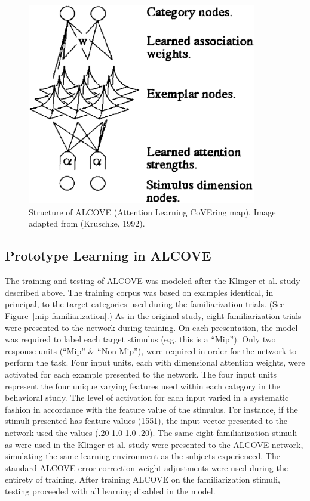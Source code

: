 \begin{figure}[ht]
\begin{center}
	\includegraphics[width=100mm]{figures/alcove.eps}
\end{center}
\caption{Structure of ALCOVE (Attention Learning CoVEring map).  Image adapted from (Kruschke, 1992).}
\label{alcove}
\end{figure} 

\subsection{Prototype Learning in ALCOVE}
The training and testing of ALCOVE was modeled after the Klinger et al. study described above.  The training corpus was based on examples identical, in principal, to the target categories used during the familiarization trials. (See Figure~\ref{mip-familiarization}.)  As in the original study, eight familiarization trials were presented to the network during training.  On each presentation, the model was required to label each target stimulus (e.g. this is a ``Mip'').  Only two response units (``Mip'' \& ``Non-Mip''), were required in order for the network to perform the task.  Four input units, each with dimensional attention weights, were activated for each example presented to the network.  The four input units represent the four unique varying features used within each category in the behavioral study.  The level of activation for each input varied in a systematic fashion in accordance with the feature value of the stimulus.  For instance, if the stimuli presented has feature values (1551), the input vector presented to the network used the values (.20 1.0 1.0 .20). The same eight familiarization stimuli as were used in the Klinger et al. study were presented to the ALCOVE network, simulating the same learning environment as the subjects experienced.  The standard ALCOVE error correction weight adjustments were used during the entirety of training.   After training ALCOVE on the familiarization stimuli, testing proceeded with all learning disabled in the model.  

